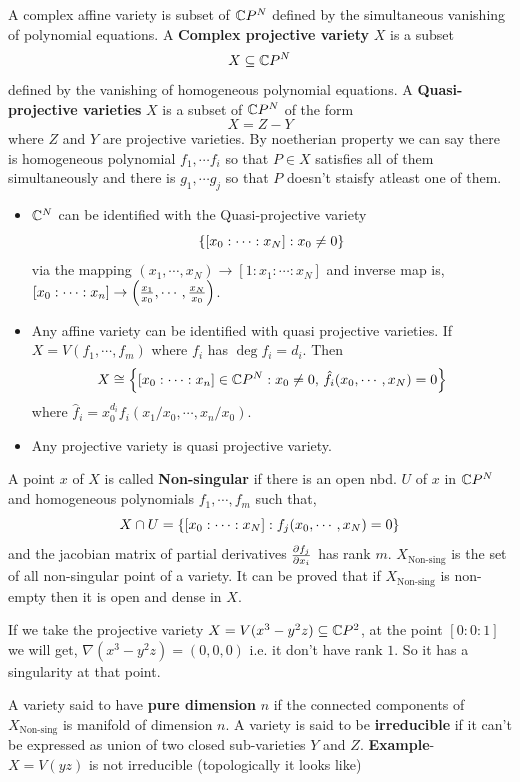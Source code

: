 \documentclass[11pt]{article}
\begin{document}
\vspace*{0.2cm}

\noindent A complex affine variety is subset of $\mathbb{C} P^N$ defined by the simultaneous vanishing of polynomial equations. A \textbf{Complex projective variety} $X$ is a subset $$X \subseteq \mathbb{C} P^N$$ defined by the vanishing of homogeneous polynomial equations. A \textbf{Quasi-projective varieties} $X$ is a subset of $\mathbb{C} P^N$ of the form $$ X = Z - Y$$ where $Z$ and $Y$ are projective varieties. By noetherian property we can say there is homogeneous polynomial $f_1,\cdots f_i$ so that $P \in X$ satisfies all of them simultaneously and there is $g_1,\cdots g_j$ so that $P$ doesn't staisfy atleast one of them.
\begin{itemize}
    \item[]   $\mathbb{C}^N$ can be identified with the Quasi-projective variety $$\qty{[x_0:\cdots:x_N]: x_0 \neq 0}$$ via the mapping $(x_1,\cdots,x_N) \to [1:x_1:\cdots :x_N]$ and inverse map is, $[x_0:\cdots:x_n] \to \qty(\frac{x_1}{x_0},\cdots,\frac{x_N}{x_0})$.
    \item[]  Any affine variety can be identified with quasi projective varieties. If $X = V(f_1,\cdots ,f_m)$ where $f_i$ has $\deg f_i = d_i$. Then $$X \cong \qty{[x_0:\cdots: x_n] \in \mathbb{C}P^N : x_0 \neq 0, \, \hat{f}_i(x_0,\cdots,x_N)=0}$$ where $\hat{f}_i = x_0^{d_i} f_i(x_1/x_0,\cdots,x_n/x_0)$.
    \item[]  Any projective variety is quasi projective variety.
\end{itemize}
A point $x$ of $X$ is called \textbf{Non-singular} if there is an open nbd. $U$ of $x$ in $\mathbb{C} P^N$ and homogeneous polynomials $f_1,\cdots,f_m$ such that, $$X \cap U = \qty{[x_0:\cdots:x_N]:f_j(x_0,\cdots,x_N)=0}$$ and the jacobian matrix of partial derivatives $\pdv{f_j}{x_i}$ has rank $m$. $X_{\text{Non-sing}}$ is the set of all non-singular point of a variety. It can be proved that if $X_{\text{Non-sing}}$ is non-empty then it is open and dense in $X$.

\vspace*{0.2cm}

\noindent {} If we take the projective variety $X = V(x^3-y^2z) \subseteq \mathbb{C} P^2$, at the point $[0:0:1]$ we will get, $\nabla(x^3-y^2z) = (0,0,0)$ i.e. it don't have rank $1$. So it has a singularity at that point.  

\pagebreak

A variety said to have \textbf{pure dimension} $n$ if the connected components of $X_{\text{Non-sing}}$ is manifold of dimension $n$. A variety is said to be \textbf{irreducible} if it can't be expressed as union of two closed sub-varieties $Y$ and $Z$. \textbf{Example}- $X = V(yz)$ is not irreducible (topologically it looks like) 
\end{document}
